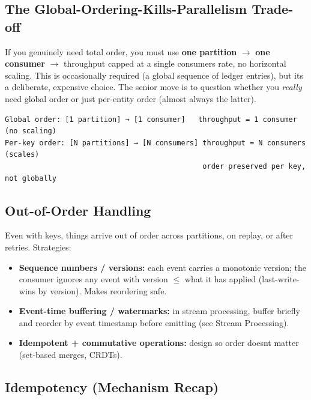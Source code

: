 \documentclass[11pt]{article}
\providecommand{\tightlist}{\setlength{\itemsep}{1pt}\setlength{\parskip}{0pt}}
\begin{document}
\subsection{The Global-Ordering-Kills-Parallelism Trade-off}\label{the-global-ordering-kills-parallelism-trade-off}

If you genuinely need total order, you must use \textbf{one partition} \(\rightarrow\) \textbf{one consumer} \(\rightarrow\) throughput capped at a single consumer\textquotesingle s rate, no horizontal scaling. This is occasionally required (a global sequence of ledger entries), but it\textquotesingle s a deliberate, expensive choice. The senior move is to question whether you \emph{really} need global order or just per-entity order (almost always the latter).

\setcodelang{}

\begin{verbatim}
Global order: [1 partition] → [1 consumer]   throughput = 1 consumer  (no scaling)
Per-key order: [N partitions] → [N consumers] throughput = N consumers (scales)
                                              order preserved per key, not globally
\end{verbatim}

\subsection{Out-of-Order Handling}\label{out-of-order-handling}

Even with keys, things arrive out of order across partitions, on replay, or after retries. Strategies:

\begin{itemize}
\tightlist
\item
  \textbf{Sequence numbers / versions:} each event carries a monotonic version; the consumer ignores any event with version \(\leq\) what it has applied (last-write-wins by version). Makes reordering safe.
\item
  \textbf{Event-time buffering / watermarks:} in stream processing, buffer briefly and reorder by event timestamp before emitting (see Stream Processing).
\item
  \textbf{Idempotent + commutative operations:} design so order doesn\textquotesingle t matter (set-based merges, CRDTs).
\end{itemize}

\subsection{Idempotency (Mechanism Recap)}\label{idempotency-mechanism-recap}
\end{document}
